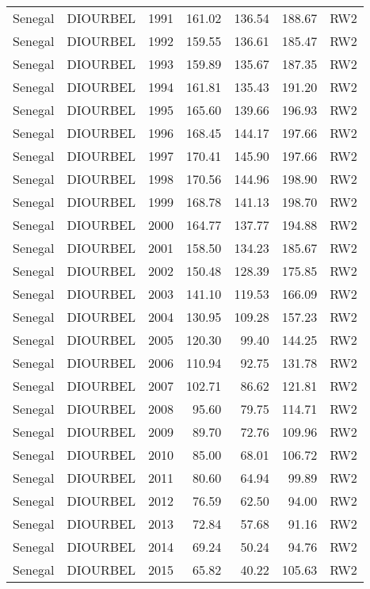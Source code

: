 \begin{longtable}{lllrrrl}
  Senegal & DIOURBEL & 1991 & 161.02 & 136.54 & 188.67 & RW2 \\ 
  Senegal & DIOURBEL & 1992 & 159.55 & 136.61 & 185.47 & RW2 \\ 
  Senegal & DIOURBEL & 1993 & 159.89 & 135.67 & 187.35 & RW2 \\ 
  Senegal & DIOURBEL & 1994 & 161.81 & 135.43 & 191.20 & RW2 \\ 
  Senegal & DIOURBEL & 1995 & 165.60 & 139.66 & 196.93 & RW2 \\ 
  Senegal & DIOURBEL & 1996 & 168.45 & 144.17 & 197.66 & RW2 \\ 
  Senegal & DIOURBEL & 1997 & 170.41 & 145.90 & 197.66 & RW2 \\ 
  Senegal & DIOURBEL & 1998 & 170.56 & 144.96 & 198.90 & RW2 \\ 
  Senegal & DIOURBEL & 1999 & 168.78 & 141.13 & 198.70 & RW2 \\ 
  Senegal & DIOURBEL & 2000 & 164.77 & 137.77 & 194.88 & RW2 \\ 
  Senegal & DIOURBEL & 2001 & 158.50 & 134.23 & 185.67 & RW2 \\ 
  Senegal & DIOURBEL & 2002 & 150.48 & 128.39 & 175.85 & RW2 \\ 
  Senegal & DIOURBEL & 2003 & 141.10 & 119.53 & 166.09 & RW2 \\ 
  Senegal & DIOURBEL & 2004 & 130.95 & 109.28 & 157.23 & RW2 \\ 
  Senegal & DIOURBEL & 2005 & 120.30 & 99.40 & 144.25 & RW2 \\ 
  Senegal & DIOURBEL & 2006 & 110.94 & 92.75 & 131.78 & RW2 \\ 
  Senegal & DIOURBEL & 2007 & 102.71 & 86.62 & 121.81 & RW2 \\ 
  Senegal & DIOURBEL & 2008 & 95.60 & 79.75 & 114.71 & RW2 \\ 
  Senegal & DIOURBEL & 2009 & 89.70 & 72.76 & 109.96 & RW2 \\ 
  Senegal & DIOURBEL & 2010 & 85.00 & 68.01 & 106.72 & RW2 \\ 
  Senegal & DIOURBEL & 2011 & 80.60 & 64.94 & 99.89 & RW2 \\ 
  Senegal & DIOURBEL & 2012 & 76.59 & 62.50 & 94.00 & RW2 \\ 
  Senegal & DIOURBEL & 2013 & 72.84 & 57.68 & 91.16 & RW2 \\ 
  Senegal & DIOURBEL & 2014 & 69.24 & 50.24 & 94.76 & RW2 \\ 
  Senegal & DIOURBEL & 2015 & 65.82 & 40.22 & 105.63 & RW2 \\ 

\end{longtable}
